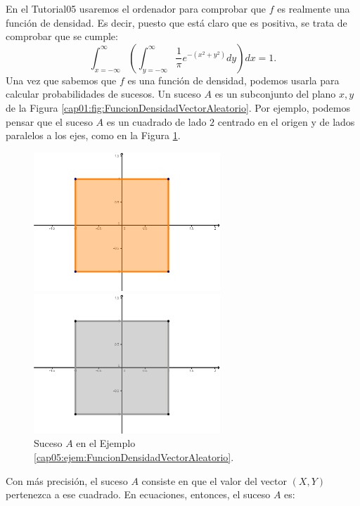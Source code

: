 \begin{ejemplo}
  En el Tutorial05 usaremos el ordenador para comprobar que $f$ es realmente una función de densidad. Es decir, puesto que está claro que es positiva, se trata de comprobar que se cumple:
\[
\int_{x=-\infty}^{\infty}\left(\int_{y=-\infty}^{\infty}\dfrac{1}{\pi}e^{-(x^2+y^2)}dy\right)dx = 1.
\]
Una vez que sabemos que $f$ es una función de densidad, podemos usarla para calcular probabilidades de sucesos. Un suceso $A$ es un subconjunto del plano $x,y$ de la Figura \ref{cap01:fig:FuncionDensidadVectorAleatorio}. Por ejemplo, podemos pensar que el suceso $A$ es un cuadrado de lado $2$ centrado en el origen y de lados paralelos a los ejes, como en la Figura \ref{cap01:fig:RegionIntegracionEjemploDensidadVectorAleatorio}.
   \begin{figure}[hbt]
	\begin{center}
	\begin{enColor}
    \includegraphics[width=7cm]{../fig/Cap05-RegionIntegracionEjemploDensidadVectorAleatorio.png}
	\end{enColor}
	\begin{bn}
    \includegraphics[width=7cm]{../fig/Cap05-RegionIntegracionEjemploDensidadVectorAleatorio-bn.png}
	\end{bn}
	\caption{Suceso $A$ en el Ejemplo \ref{cap05:ejem:FuncionDensidadVectorAleatorio}.}
	\label{cap01:fig:RegionIntegracionEjemploDensidadVectorAleatorio}
    \end{center}
  \end{figure}
Con más precisión, el suceso $A$ consiste en que el valor del vector $(X,Y)$ pertenezca a ese cuadrado. En ecuaciones, entonces, el suceso $A$ es:

\end{ejemplo}
